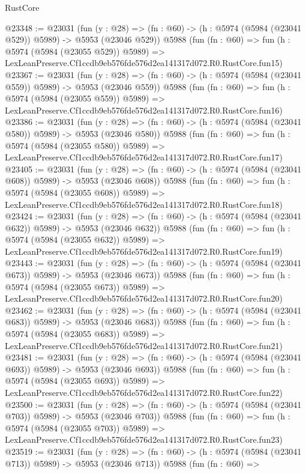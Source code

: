 \begin{lexlean}{RustCore}
\begin{coremodule}
@23348 := @23031
    (fun (y : @28) => (fn : @60) -> (h : @5974 (@5984 (@23041 @529)) @5989) -> @5953 (@23046 @529))
    @5988
    (fun (fn : @60) =>
    fun (h : @5974 (@5984 (@23055 @529)) @5989) =>
    LexLeanPreserve.Cf1ccdb9eb576fde576d2ea141317d072.R0.RustCore.fun15)
@23367 := @23031
    (fun (y : @28) => (fn : @60) -> (h : @5974 (@5984 (@23041 @559)) @5989) -> @5953 (@23046 @559))
    @5988
    (fun (fn : @60) =>
    fun (h : @5974 (@5984 (@23055 @559)) @5989) =>
    LexLeanPreserve.Cf1ccdb9eb576fde576d2ea141317d072.R0.RustCore.fun16)
@23386 := @23031
    (fun (y : @28) => (fn : @60) -> (h : @5974 (@5984 (@23041 @580)) @5989) -> @5953 (@23046 @580))
    @5988
    (fun (fn : @60) =>
    fun (h : @5974 (@5984 (@23055 @580)) @5989) =>
    LexLeanPreserve.Cf1ccdb9eb576fde576d2ea141317d072.R0.RustCore.fun17)
@23405 := @23031
    (fun (y : @28) => (fn : @60) -> (h : @5974 (@5984 (@23041 @608)) @5989) -> @5953 (@23046 @608))
    @5988
    (fun (fn : @60) =>
    fun (h : @5974 (@5984 (@23055 @608)) @5989) =>
    LexLeanPreserve.Cf1ccdb9eb576fde576d2ea141317d072.R0.RustCore.fun18)
@23424 := @23031
    (fun (y : @28) => (fn : @60) -> (h : @5974 (@5984 (@23041 @632)) @5989) -> @5953 (@23046 @632))
    @5988
    (fun (fn : @60) =>
    fun (h : @5974 (@5984 (@23055 @632)) @5989) =>
    LexLeanPreserve.Cf1ccdb9eb576fde576d2ea141317d072.R0.RustCore.fun19)
@23443 := @23031
    (fun (y : @28) => (fn : @60) -> (h : @5974 (@5984 (@23041 @673)) @5989) -> @5953 (@23046 @673))
    @5988
    (fun (fn : @60) =>
    fun (h : @5974 (@5984 (@23055 @673)) @5989) =>
    LexLeanPreserve.Cf1ccdb9eb576fde576d2ea141317d072.R0.RustCore.fun20)
@23462 := @23031
    (fun (y : @28) => (fn : @60) -> (h : @5974 (@5984 (@23041 @683)) @5989) -> @5953 (@23046 @683))
    @5988
    (fun (fn : @60) =>
    fun (h : @5974 (@5984 (@23055 @683)) @5989) =>
    LexLeanPreserve.Cf1ccdb9eb576fde576d2ea141317d072.R0.RustCore.fun21)
@23481 := @23031
    (fun (y : @28) => (fn : @60) -> (h : @5974 (@5984 (@23041 @693)) @5989) -> @5953 (@23046 @693))
    @5988
    (fun (fn : @60) =>
    fun (h : @5974 (@5984 (@23055 @693)) @5989) =>
    LexLeanPreserve.Cf1ccdb9eb576fde576d2ea141317d072.R0.RustCore.fun22)
@23500 := @23031
    (fun (y : @28) => (fn : @60) -> (h : @5974 (@5984 (@23041 @703)) @5989) -> @5953 (@23046 @703))
    @5988
    (fun (fn : @60) =>
    fun (h : @5974 (@5984 (@23055 @703)) @5989) =>
    LexLeanPreserve.Cf1ccdb9eb576fde576d2ea141317d072.R0.RustCore.fun23)
@23519 := @23031
    (fun (y : @28) => (fn : @60) -> (h : @5974 (@5984 (@23041 @713)) @5989) -> @5953 (@23046 @713))
    @5988
    (fun (fn : @60) =>

\end{coremodule}
\end{lexlean}
